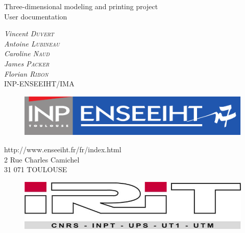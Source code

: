 \documentclass{article}
\begin{document}
\bigskip
\bigskip
\bigskip
\bigskip
\bigskip
\bigskip
\bigskip
\bigskip

\begin{center}
\LARGE{Three-dimensional modeling and printing project\\User documentation \\}
\bigskip
\bigskip\end{center}

\bigskip
\bigskip

\begin{center}
\large{
\textit{Vincent \textsc{Duvert} \\
Antoine \textsc{Lubineau} \\
Caroline \textsc{Naud} \\
James \textsc{Packer} \\
Florian \textsc{Ribon}} \\
\bigskip
INP-ENSEEIHT/IMA 
}
\end{center}

\begin{figure}[!h]
\begin{center}
	\includegraphics[scale=0.8]{./Images/inp-enseeiht}
\end{center}
\end{figure}

\bigskip

\begin{center}
http://www.enseeiht.fr/fr/index.html \\
2 Rue Charles Camichel \\
31 071 TOULOUSE
\end{center}

\bigskip

\begin{figure}[!h]
\begin{center}
	\includegraphics[scale=0.4]{./Images/irit}
\end{center}
\end{figure}
\end{document}
